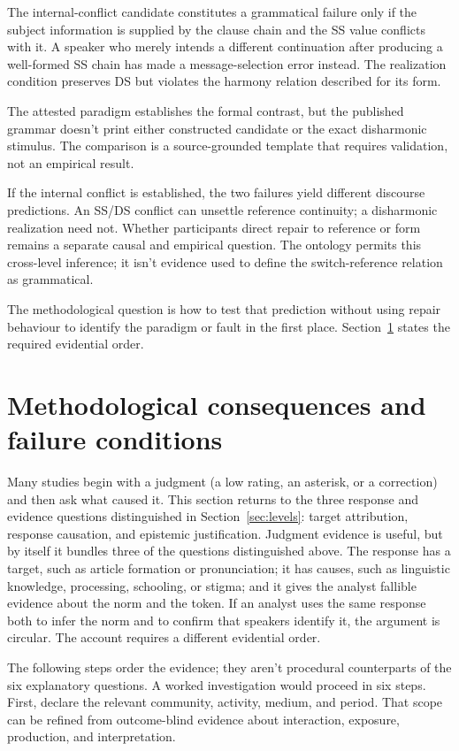 \documentclass[12pt,letterpaper]{article}
\begin{document}
The internal-conflict candidate constitutes a grammatical failure only if the
subject information is supplied by the clause chain and the SS value conflicts
with it. A speaker who
merely intends a different continuation after producing a
well-formed SS chain has made a message-selection error instead. The realization
condition preserves DS but violates the harmony relation described for its form.

The attested paradigm establishes the formal contrast, but the published grammar
doesn't print either constructed candidate or the exact disharmonic stimulus.
The comparison is a source-grounded template that requires validation, not an
empirical result.

If the internal conflict is established, the two failures yield different
discourse predictions. An SS/DS conflict can unsettle reference continuity; a
disharmonic realization need not. Whether participants direct repair to reference
or form remains a separate causal and empirical question. The ontology permits
this cross-level inference; it isn't evidence used to
define the switch-reference relation as grammatical.

The methodological question is how to test that prediction without using repair
behaviour to identify the paradigm or fault in the first place.
Section~\ref{sec:method} states the required evidential order.


\section{Methodological consequences and failure conditions}
\label{sec:method}

Many studies begin with a judgment (a low rating, an asterisk, or a correction)
and then ask what caused it. This section returns to the three response and
evidence questions distinguished in Section~\ref{sec:levels}: target attribution,
response causation, and epistemic justification. Judgment evidence is useful, but
by itself it bundles three
of the questions distinguished above. The response has a target, such as article
formation or pronunciation; it has causes, such as linguistic knowledge,
processing, schooling, or stigma; and it gives the analyst fallible evidence
about the norm and the token. If an analyst uses the same response both to infer
the norm and to confirm that speakers identify it, the argument is circular. The
account requires a different evidential order.

The following steps order the evidence; they aren't procedural counterparts of
the six explanatory questions. A worked investigation would proceed in six steps.
First, declare the relevant
community, activity, medium, and period. That scope can be refined from
outcome-blind evidence about interaction, exposure, production, and
interpretation.
\end{document}
